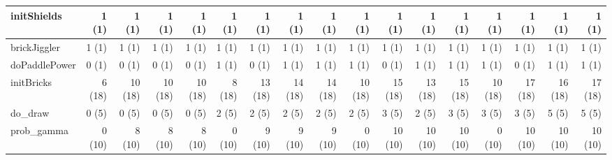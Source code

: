 \begin{table*}
\begin{tabular}{l|rrrr|rrrr|rrrr|rrrr}
      \midrule
      initShields     & 1 (1)   & 1 (1)   & 1 (1)    & 1 (1)     & 1 (1)   & 1 (1)   & 1 (1)    & 1 (1)     & 1 (1)   & 1 (1)   & 1 (1)    & 1 (1)     & 1 (1)    & 1 (1)   & 1 (1)     & 1 (1) \\
      \midrule
      brickJiggler    & 1 (1)   & 1 (1)   & 1 (1)    & 1 (1)     & 1 (1)   & 1 (1)   & 1 (1)    & 1 (1)     & 1 (1)   & 1 (1)   & 1 (1)    & 1 (1)     & 1 (1)    & 1 (1)   & 1 (1)     & 1 (1) \\
      doPaddlePower   & 0 (1)   & 0 (1)   & 0 (1)    & 0 (1)     & 1 (1)   & 0 (1)   & 1 (1)    & 1 (1)     & 1 (1)   & 0 (1)   & 1 (1)    & 1 (1)     & 1 (1)    & 0 (1)   & 1 (1)     & 1 (1) \\
      initBricks      & 6 (18)  & 10 (18) & 10 (18)  & 10 (18)   & 8 (18)  & 13 (18) & 14 (18)  & 14 (18)   & 10 (18) & 15 (18) & 13 (18)  & 15 (18)   & 10 (18)  & 17 (18) & 16 (18)   & 17 (18) \\
      \midrule
      do\_draw        & 0 (5)   & 0 (5)   & 0 (5)    & 0 (5)     & 2 (5)   & 2 (5)   & 2 (5)    & 2 (5)     & 2 (5)   & 3 (5)   & 2 (5)    & 3 (5)     & 3 (5)    & 3 (5)   & 5 (5)     & 5 (5) \\
      \midrule
      prob\_gamma     & 0 (10)  & 8 (10)  & 8 (10)   & 8 (10)    & 0 (10)  & 9 (10)  & 9 (10)   & 9 (10)    & 0 (10)  & 10 (10) & 10 (10)  & 10 (10)   & 0 (10)   & 10 (10) & 10 (10)   & 10 (10) \\
      \bottomrule
    \end{tabular}
\end{table*}
